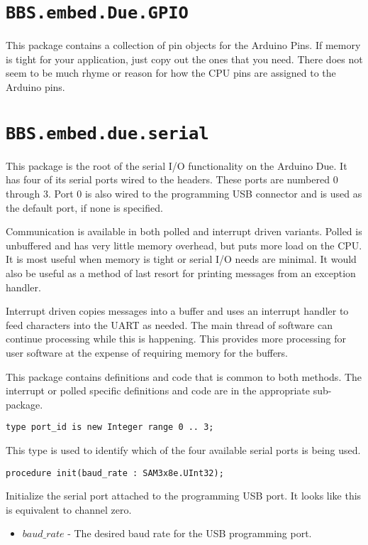 \documentclass[10pt, openany]{book}
\newcommand{\indextype}[1]{\index[type]{#1}}
\newcommand{\indexfunc}[1]{\index[func]{#1}}
\newcommand{\package}[1]{\texttt{#1}}
\begin{document}
\section{\package{BBS.embed.Due.GPIO}}
This package contains a collection of pin objects for the Arduino Pins.  If memory is tight for your application, just copy out the ones that you need.  There does not seem to be much rhyme or reason for how the CPU pins are assigned to the Arduino pins.

\section{\package{BBS.embed.due.serial}}
This package is the root of the serial I/O functionality on the Arduino Due.  It has four of its serial ports wired to the headers.  These ports are numbered 0 through 3.  Port 0 is also wired to the programming USB connector and is used as the default port, if none is specified.

Communication is available in both polled and interrupt driven variants.  Polled is unbuffered and has very little memory overhead, but puts more load on the CPU.  It is most useful when memory is tight or serial I/O needs are minimal.  It would also be useful as a method of last resort for printing messages from an exception handler.

Interrupt driven copies messages into a buffer and uses an interrupt handler to feed characters into the UART as needed.  The main thread of software can continue processing while this is happening.  This provides more processing for user software at the expense of requiring memory for the buffers.

This package contains definitions and code that is common to both methods. The interrupt or polled specific definitions and code are in the appropriate sub-package.

\begin{lstlisting}
type port_id is new Integer range 0 .. 3;
\end{lstlisting}
\indextype{port\_id}
This type is used to identify which of the four available serial ports is being used.

\begin{lstlisting}
procedure init(baud_rate : SAM3x8e.UInt32);
\end{lstlisting}
\indexfunc{init}
Initialize the serial port attached to the programming USB port.  It looks like this is equivalent to channel zero.
\begin{itemize}
  \item $baud\_rate$ - The desired baud rate for the USB programming port.
\end{itemize}
\end{document}
